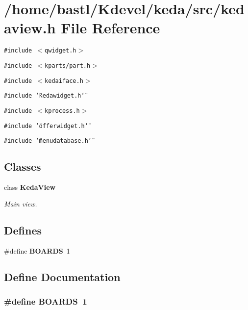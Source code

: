 \section{/home/bastl/Kdevel/keda/src/kedaview.h File Reference}
\label{kedaview_8h}
{\tt \#include $<$qwidget.h$>$}\par
{\tt \#include $<$kparts/part.h$>$}\par
{\tt \#include $<$kedaiface.h$>$}\par
{\tt \#include \char`\"{}kedawidget.h\char`\"{}}\par
{\tt \#include $<$kprocess.h$>$}\par
{\tt \#include \char`\"{}offerwidget.h\char`\"{}}\par
{\tt \#include \char`\"{}menudatabase.h\char`\"{}}\par
\subsection*{Classes}
\begin{CompactItemize}
\item 
class {\bf Keda\-View}
\begin{CompactList}\small\item\em Main view. \item\end{CompactList}\end{CompactItemize}
\subsection*{Defines}
\begin{CompactItemize}
\item 
\#define {\bf BOARDS}~1
\end{CompactItemize}


\subsection{Define Documentation}
\subsubsection{\setlength{\rightskip}{0pt plus 5cm}\#define BOARDS~1}\label{kedaview_8h_bdeab5be7e648ebf494dff98c8d794e7}


